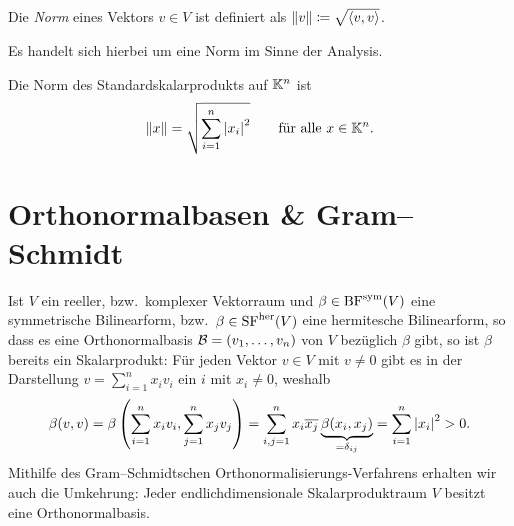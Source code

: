 \begin{definition}
  Die \emph{Norm} eines Vektors $v \in V$ ist definiert als $\left\| v \right\| \coloneqq \sqrt{ \left\langle v, v \right\rangle }$.
\end{definition}

\begin{remark}
  Es handelt sich hierbei um eine Norm im Sinne der Analysis.
\end{remark}

\begin{example}
  Die Norm des Standardskalarprodukts auf $\mathbb{K}^n$ ist
  \[
      \left\| x \right\|
    = \sqrt{ \sum_{i=1}^n \left| x_i \right|^2 }
    \qquad
    \text{für alle $x \in \mathbb{K}^n$}.
  \]
\end{example}






\section{Orthonormalbasen \& Gram--Schmidt}

Ist $V$ ein reeller, bzw.\ komplexer Vektorraum und $\beta \in \operatorname{BF}^{\operatorname{sym}}(V)$ eine symmetrische Bilinearform, bzw.\ $\beta \in \operatorname{SF}^{\operatorname{her}}(V)$ eine hermitesche Bilinearform, so dass es eine Orthonormalbasis $\mathcal{B} = (v_1, \dotsc, v_n)$ von $V$ bezüglich $\beta$ gibt, so ist $\beta$ bereits ein Skalarprodukt:
Für jeden Vektor $v \in V$ mit $v \neq 0$ gibt es in der Darstellung $v = \sum_{i=1}^n x_i v_i$ ein $i$ mit $x_i \neq 0$, weshalb
\[
    \beta(v,v)
  = \beta\left( \sum_{i=1}^n x_i v_i, \sum_{j=1}^n x_j v_j \right)
  = \sum_{i,j = 1}^n x_i \overline{x_j} \underbrace{ \beta(x_i, x_j)}_{= \delta_{ij}}
  = \sum_{i=1}^n \left| x_i \right|^2
  > 0.
\]
Mithilfe des Gram--Schmidtschen Orthonormalisierungs-Verfahrens erhalten wir auch die Umkehrung:
Jeder endlichdimensionale Skalarproduktraum $V$ besitzt eine Orthonormalbasis.

